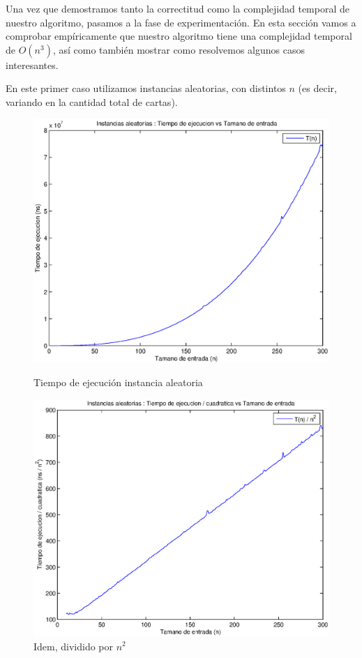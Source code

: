 Una vez que demostramos tanto la correctitud como la complejidad temporal de nuestro algoritmo, pasamos a la fase de experimentación. En esta sección vamos a comprobar empíricamente que nuestro algoritmo tiene una complejidad temporal de $O(n^3)$, así como también mostrar como resolvemos algunos casos interesantes.

En este primer caso utilizamos instancias aleatorias, con distintos $n$ (es decir, variando en la cantidad total de cartas).

\begin{figure}[H]
  \begin{minipage}{0.5\linewidth}
    \includegraphics[width=\linewidth]{img/problema1/instancia_aleatoria.eps}
    \caption{Tiempo de ejecución instancia aleatoria}\label{fig:problema1-aleatoria}
  \end{minipage}
  \hfill
  \begin{minipage}{0.5\linewidth}
    \includegraphics[width=\linewidth]{img/problema1/instancia_aleatoria_div_n2.eps}
    \caption{Idem, dividido por $n^2$}\label{fig:problema1-aleatoria-n2}
  \end{minipage}
\end{figure}

